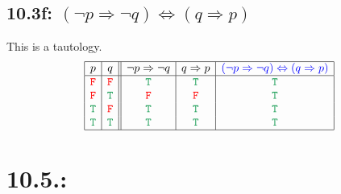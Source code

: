 \documentclass{article}
\begin{document}
\subsection*{10.3f: $(\neg p\Rightarrow\neg q)\Leftrightarrow(q\Rightarrow p)$}
This is a tautology.
\[\begin{array}{|c|c||c|c|c|}
\hline
p&q&\neg p\Rightarrow\neg q&q\Rightarrow p&\textcolor{blue}{(\neg p\Rightarrow\neg q)\Leftrightarrow(q\Rightarrow p)}\\
\hline
\textcolor{red}{\tt{F}}&\textcolor{red}{\tt{F}}&\textcolor{ForestGreen}{\tt{T}}&\textcolor{ForestGreen}{\tt{T}}&\textcolor{ForestGreen}{\tt{T}}\\
\textcolor{red}{\tt{F}}&\textcolor{ForestGreen}{\tt{T}}&\textcolor{red}{\tt{F}}&\textcolor{red}{\tt{F}}&\textcolor{ForestGreen}{\tt{T}}\\
\textcolor{ForestGreen}{\tt{T}}&\textcolor{red}{\tt{F}}&\textcolor{ForestGreen}{\tt{T}}&\textcolor{ForestGreen}{\tt{T}}&\textcolor{ForestGreen}{\tt{T}}\\
\textcolor{ForestGreen}{\tt{T}}&\textcolor{ForestGreen}{\tt{T}}&\textcolor{ForestGreen}{\tt{T}}&\textcolor{ForestGreen}{\tt{T}}&\textcolor{ForestGreen}{\tt{T}}\\
\hline
\end{array}\]
\section*{10.5.:}
\end{document}
